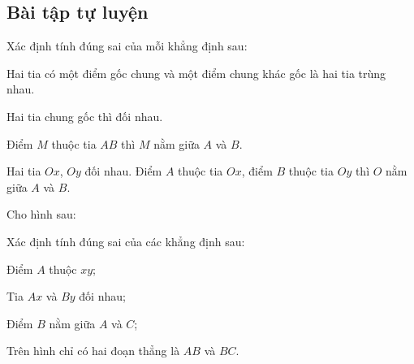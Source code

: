 \subsection{Bài tập tự luyện}
\begin{bt}%
Xác định tính đúng sai của mỗi khẳng định sau:
\begin{enumEX}{1}
\item Hai tia có một điểm gốc chung và một điểm chung khác gốc là hai tia trùng nhau.
\item Hai tia chung gốc thì đối nhau.
\item Điểm $M$ thuộc tia $AB$ thì $M$ nằm giữa $A$ và $B$.
\item Hai tia $Ox$, $Oy$ đối nhau. Điểm $A$ thuộc tia $Ox$, điểm $B$ thuộc tia $Oy$ thì $O$ nằm giữa $A$ và $B$.
\end{enumEX}
\end{bt}
\begin{bt}%
Cho hình sau: 
		\begin{center}
		\end{center}
Xác định tính đúng sai của các khẳng định sau:
\begin{enumEX}{1}
	\item Điểm $A$ thuộc $xy$;
	\item Tia $Ax$ và $By$ đối nhau;
	\item Điểm $B$ nằm giữa $A$ và $C$;
	\item Trên hình chỉ có hai đoạn thẳng là $AB$ và $BC$.
\end{enumEX}
\end{bt}
